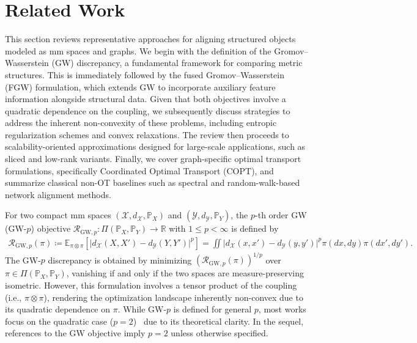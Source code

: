 \documentclass{article}
\theoremstyle{plain}
\theoremstyle{definition}
\theoremstyle{remark}
\begin{document}
\section{Related Work}\label{App:related-work}

This section reviews representative approaches for aligning structured objects modeled as mm spaces and graphs. We begin with the definition of the Gromov--Wasserstein (GW) discrepancy, a fundamental framework for comparing metric structures. This is immediately followed by the fused Gromov--Wasserstein (FGW) formulation, which extends GW to incorporate auxiliary feature information alongside structural data. Given that both objectives involve a quadratic dependence on the coupling, we subsequently discuss strategies to address the inherent non-convexity of these problems, including entropic regularization schemes and convex relaxations. The review then proceeds to scalability-oriented approximations designed for large-scale applications, such as sliced and low-rank variants. Finally, we cover graph-specific optimal transport formulations, specifically Coordinated Optimal Transport (COPT), and summarize classical non-OT baselines such as spectral and random-walk-based network alignment methods.

For two compact mm spaces $(\mathcal{X},d_{\mathcal{X}},\mathbb{P}_X)$ and $(\mathcal{Y},d_{\mathcal{Y}},\mathbb{P}_Y)$, the $p$-th order GW (GW-$p$) objective $\mathcal{R}_{\mathrm{GW},p} : \Pi(\mathbb{P}_X,\mathbb{P}_Y) \to \mathbb{R}$ with $1 \leq p < \infty$ is defined by
\begin{align*}
	\mathcal{R}_{\mathrm{GW},p}(\pi)
	\coloneqq
	\mathbb{E}_{\pi \otimes \pi}\!\left[\big|d_{\mathcal{X}}(X,X') - d_{\mathcal{Y}}(Y,Y')\big|^p\right] = \iint \big| d_{\mathcal{X}}(x,x') - d_{\mathcal{Y}}(y,y') \big|^p \pi(dx,dy)\pi(dx',dy') .
\end{align*}
The GW-$p$ discrepancy is obtained by minimizing $(\mathcal{R}_{\mathrm{GW},p}(\pi))^{1/p}$ over $\pi \in \Pi(\mathbb{P}_X,\mathbb{P}_Y)$, vanishing if and only if the two spaces are measure-preserving isometric. However, this formulation involves a tensor product of the coupling (i.e., $\pi \otimes \pi$), rendering the optimization landscape inherently non-convex due to its quadratic dependence on $\pi$. While GW-$p$ is defined for general $p$, most works focus on the quadratic case ($p=2$)~\citep{memoli2011gromov, peyre2016gromov, rioux2024entropic, chen2024semidefinite} due to its theoretical clarity. In the sequel, references to the GW objective imply $p=2$ unless otherwise specified.
\end{document}
